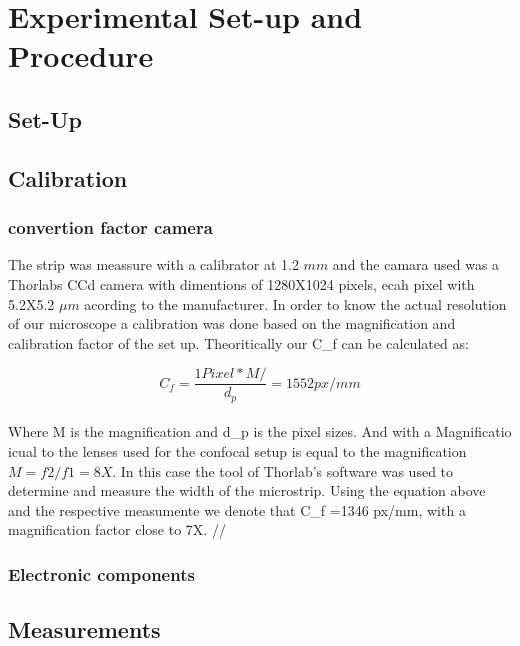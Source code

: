 \section{Experimental Set-up and Procedure}
\subsection{Set-Up}

\subsection{Calibration}
\subsubsection{convertion factor camera}
The strip was meassure with a calibrator at 1.2 $mm$ and the camara used was a Thorlabs CCd camera with dimentions of 1280X1024 pixels, ecah pixel with 5.2X5.2 $\mu m$ acording to the manufacturer.
In order to know the actual resolution of our microscope a calibration was done based on the magnification and calibration factor of the set up.
Theoritically our C_{f} can be calculated as:

\begin{equation}
C_{f}=\dfrac{1 Pixel * M/}{d_{p}} = 1552 px/mm
\end{equation}\\
Where M is the magnification and d_{p} is the pixel sizes. And with a Magnificatio icual to the lenses used for the confocal setup is equal to the magniﬁcation $M=f2/f1=8X$.
In this case the tool of Thorlab’s software was used to determine and measure the width of the microstrip. Using the equation above and the respective measumente we denote that  C_{f} =1346 px/mm, with a magnification factor close to 7X.
//

\subsubsection{Electronic components}



\subsection{Measurements}